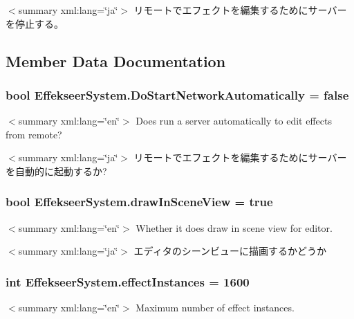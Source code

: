 $<$summary xml\-:lang=\char`\"{}ja\char`\"{}$>$ リモートでエフェクトを編集するためにサーバーを停止する。 

\subsection{Member Data Documentation}
\hypertarget{class_effekseer_system_a8fbc8f8d2b4986ad50d4e335349b0d00}{
\subsubsection[{Do\-Start\-Network\-Automatically}]{\setlength{\rightskip}{0pt plus 5cm}bool Effekseer\-System.\-Do\-Start\-Network\-Automatically = false}}\label{class_effekseer_system_a8fbc8f8d2b4986ad50d4e335349b0d00}
$<$summary xml\-:lang=\char`\"{}en\char`\"{}$>$ Does run a server automatically to edit effects from remote? 

$<$summary xml\-:lang=\char`\"{}ja\char`\"{}$>$ リモートでエフェクトを編集するためにサーバーを自動的に起動するか? \hypertarget{class_effekseer_system_a469cf59d9deeaef6e27b15c5fc5ee524}{
\subsubsection[{draw\-In\-Scene\-View}]{\setlength{\rightskip}{0pt plus 5cm}bool Effekseer\-System.\-draw\-In\-Scene\-View = true}}\label{class_effekseer_system_a469cf59d9deeaef6e27b15c5fc5ee524}
$<$summary xml\-:lang=\char`\"{}en\char`\"{}$>$ Whether it does draw in scene view for editor. 

$<$summary xml\-:lang=\char`\"{}ja\char`\"{}$>$ エディタのシーンビューに描画するかどうか \hypertarget{class_effekseer_system_a0516609db2194d83016f439b93510f21}{
\subsubsection[{effect\-Instances}]{\setlength{\rightskip}{0pt plus 5cm}int Effekseer\-System.\-effect\-Instances = 1600}}\label{class_effekseer_system_a0516609db2194d83016f439b93510f21}
$<$summary xml\-:lang=\char`\"{}en\char`\"{}$>$ Maximum number of effect instances. 

